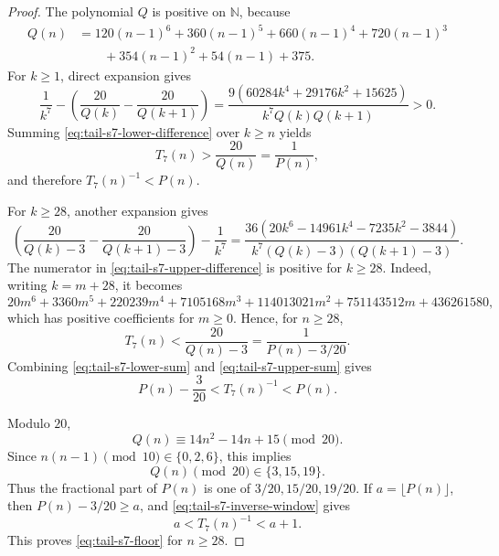 \documentclass[11pt]{article}
\numberwithin{equation}{section}
\theoremstyle{definition}
\theoremstyle{remark}
\newcommand{\N}{\mathbb N}
\newcommand{\1}{\mathbf 1}
\begin{document}
\begin{proof}
The polynomial \(Q\) is positive on \(\N\), because
\begin{equation}
\label{eq:tail-s7-q-positive}
\begin{aligned}
Q(n)
&=120(n-1)^6+360(n-1)^5+660(n-1)^4+720(n-1)^3\\
&\qquad +354(n-1)^2+54(n-1)+375.
\end{aligned}
\end{equation}
For \(k\ge1\), direct expansion gives
\begin{equation}
\label{eq:tail-s7-lower-difference}
\frac1{k^7}
-\left(\frac{20}{Q(k)}-\frac{20}{Q(k+1)}\right)
=
\frac{9(60284k^4+29176k^2+15625)}
{k^7Q(k)Q(k+1)}>0.
\end{equation}
Summing \eqref{eq:tail-s7-lower-difference} over \(k\ge n\) yields
\begin{equation}
\label{eq:tail-s7-lower-sum}
T_7(n)>\frac{20}{Q(n)}=\frac1{P(n)},
\end{equation}
and therefore \(T_7(n)^{-1}<P(n)\).

For \(k\ge28\), another expansion gives
\begin{equation}
\label{eq:tail-s7-upper-difference}
\left(\frac{20}{Q(k)-3}-\frac{20}{Q(k+1)-3}\right)
-\frac1{k^7}
=
\frac{36(20k^6-14961k^4-7235k^2-3844)}
{k^7(Q(k)-3)(Q(k+1)-3)}.
\end{equation}
The numerator in \eqref{eq:tail-s7-upper-difference} is positive for \(k\ge28\).  Indeed, writing \(k=m+28\), it becomes
\begin{equation}
\label{eq:tail-s7-upper-positive}
20m^6+3360m^5+220239m^4+7105168m^3
+114013021m^2+751143512m+436261580,
\end{equation}
which has positive coefficients for \(m\ge0\).  Hence, for \(n\ge28\),
\begin{equation}
\label{eq:tail-s7-upper-sum}
T_7(n)<\frac{20}{Q(n)-3}=\frac1{P(n)-3/20}.
\end{equation}
Combining \eqref{eq:tail-s7-lower-sum} and \eqref{eq:tail-s7-upper-sum} gives
\begin{equation}
\label{eq:tail-s7-inverse-window}
P(n)-\frac3{20}<T_7(n)^{-1}<P(n).
\end{equation}

Modulo \(20\),
\begin{equation}
\label{eq:tail-s7-q-mod}
Q(n)\equiv 14n^2-14n+15\pmod {20}.
\end{equation}
Since \(n(n-1)\pmod {10}\in\{0,2,6\}\), this implies
\begin{equation}
\label{eq:tail-s7-q-residues}
Q(n)\pmod {20}\in\{3,15,19\}.
\end{equation}
Thus the fractional part of \(P(n)\) is one of \(3/20,15/20,19/20\).  If \(a=\lfloor P(n)\rfloor\), then \(P(n)-3/20\ge a\), and \eqref{eq:tail-s7-inverse-window} gives
\begin{equation}
\label{eq:tail-s7-floor-trap}
a<T_7(n)^{-1}<a+1.
\end{equation}
This proves \eqref{eq:tail-s7-floor} for \(n\ge28\).


\end{proof}
\end{document}

